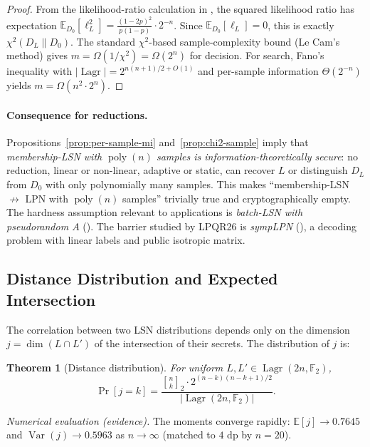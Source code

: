 \documentclass[11pt,a4paper]{article}
\theoremstyle{plain}
\newtheorem{theorem}{Theorem}[section]
\theoremstyle{definition}
\newcommand{\F}{\mathbb{F}}
\newcommand{\E}{\mathbb{E}}
\DeclareMathOperator{\Lagr}{Lagr}
\begin{document}
\begin{proof}
From the likelihood-ratio calculation in , the squared likelihood ratio has expectation $\E_{D_0}[\ell_L^2] = \frac{(1-2p)^2}{p(1-p)} \cdot 2^{-n}$.  Since $\E_{D_0}[\ell_L]=0$, this is exactly $\chi^2(D_L \| D_0)$.  The standard $\chi^2$-based sample-complexity bound (Le Cam's method) gives $m = \Omega(1/\chi^2) = \Omega(2^n)$ for decision.  For search, Fano's inequality with $|\Lagr| = 2^{n(n+1)/2+O(1)}$ and per-sample information $\Theta(2^{-n})$ yields $m = \Omega(n^2 \cdot 2^n)$.
\end{proof}

\paragraph{Consequence for reductions.} Propositions~\ref{prop:per-sample-mi} and~\ref{prop:chi2-sample} imply that \emph{membership-LSN with $\operatorname{poly}(n)$ samples is information-theoretically secure}: no reduction, linear or non-linear, adaptive or static, can recover $L$ or distinguish $D_L$ from $D_0$ with only polynomially many samples.  This makes ``membership-LSN $\not\to$ LPN with $\operatorname{poly}(n)$ samples'' trivially true and cryptographically empty.  The hardness assumption relevant to applications is \emph{batch-LSN with pseudorandom $A$} ().  The barrier studied by LPQR26 is \emph{sympLPN} (), a decoding problem with linear labels and public isotropic matrix.

\subsection{Distance Distribution and Expected Intersection}
\label{subsec:distance}

The correlation between two LSN distributions depends only on the dimension $j = \dim(L \cap L')$ of the intersection of their secrets. The distribution of $j$ is:

\begin{theorem}[Distance distribution]
\label{thm:distance}
For uniform $L, L' \in \Lagr(2n, \F_2)$,
\[
\Pr[j=k] = \frac{{n \brack k}_2 \cdot 2^{(n-k)(n-k+1)/2}}{|\Lagr(2n,\F_2)|}.
\]
\end{theorem}

\noindent\emph{Numerical evaluation (evidence).} The moments converge rapidly: $\E[j]\to 0.7645$ and $\operatorname{Var}(j)\to 0.5963$ as $n\to\infty$ (matched to $4$ dp by $n=20$).
\end{document}
